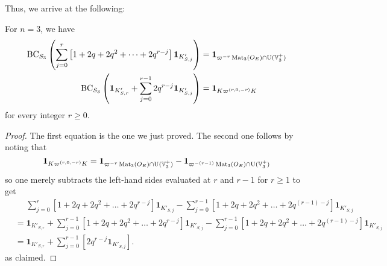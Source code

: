 Thus, we arrive at the following:
\begin{proposition}
  \label{prop:BC_S3}
  For $n = 3$, we have
  \begin{align*}
    \operatorname{BC}_{S_3} \left( \sum_{j=0}^r \left[ 1 + 2q + 2q^2 + \dots + 2q^{r-j} \right]
    \mathbf{1}_{K'_{S,j}} \right)
    &= \mathbf{1}_{\varpi^{-r} \operatorname{Mat}_3(O_E) \cap \operatorname{U}(\mathbb V_3^+)} \\
    \operatorname{BC}_{S_3} \left( \mathbf{1}_{K'_{S,r}}
    + \sum_{j=0}^{r-1} 2q^{r-j} \mathbf{1}_{K'_{S,j}} \right)
    &= \mathbf{1}_{K\varpi^{(r,0,-r)}K}
  \end{align*}
  for every integer $r \ge 0$.
\end{proposition}
\begin{proof}
  The first equation is the one we just proved.
  The second one follows by noting that
  \[
    \mathbf{1}_{K\varpi^{(r,0,-r)}K}
    = \mathbf{1}_{\varpi^{-r} \operatorname{Mat}_3(O_E) \cap \operatorname{U}(\mathbb V_3^+)}
    - \mathbf{1}_{\varpi^{-(r-1)} \operatorname{Mat}_3(O_E) \cap \operatorname{U}(\mathbb V_3^+)}
  \]
  so one merely subtracts the left-hand sides evaluated at $r$ and $r-1$ for $r \ge 1$
  to get
  \begin{align*}
    &\phantom= \sum_{j=0}^r \left[ 1 + 2q + 2q^2 + \dots + 2q^{r-j} \right] \mathbf{1}_{K'_{S,j}}
    - \sum_{j=0}^{r-1} \left[ 1 + 2q + 2q^2 + \dots + 2q^{(r-1)-j} \right] \mathbf{1}_{K'_{S,j}} \\
    &= \mathbf{1}_{K'_{S,r}} +
      \sum_{j=0}^{r-1} \left[ 1 + 2q + 2q^2 + \dots + 2q^{r-j} \right] \mathbf{1}_{K'_{S,j}}
    - \sum_{j=0}^{r-1} \left[ 1 + 2q + 2q^2 + \dots + 2q^{(r-1)-j} \right] \mathbf{1}_{K'_{S,j}} \\
    &= \mathbf{1}_{K'_{S,r}} + \sum_{j=0}^{r-1} \left[ 2q^{r-j}\mathbf{1}_{K'_{S,j}} \right].
  \end{align*}
  as claimed.
\end{proof}

